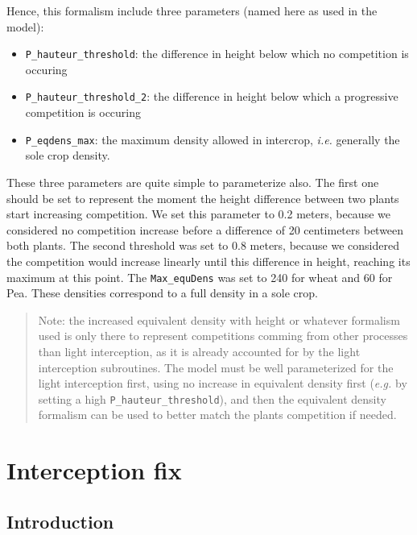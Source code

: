 \documentclass[]{book}
\providecommand{\tightlist}{%
  \setlength{\itemsep}{0pt}\setlength{\parskip}{0pt}}
\begin{document}
Hence, this formalism include three parameters (named here as used in the model):

\begin{itemize}
\tightlist
\item
  \texttt{P\_hauteur\_threshold}: the difference in height below which no competition is occuring
\item
  \texttt{P\_hauteur\_threshold\_2}: the difference in height below which a progressive competition is occuring
\item
  \texttt{P\_eqdens\_max}: the maximum density allowed in intercrop, \emph{i.e.} generally the sole crop density.
\end{itemize}

These three parameters are quite simple to parameterize also. The first one should be set to represent the moment the height difference between two plants start increasing competition. We set this parameter to 0.2 meters, because we considered no competition increase before a difference of 20 centimeters between both plants. The second threshold was set to 0.8 meters, because we considered the competition would increase linearly until this difference in height, reaching its maximum at this point. The \texttt{Max\_equDens} was set to 240 for wheat and 60 for Pea. These densities correspond to a full density in a sole crop.

\begin{quote}
Note: the increased equivalent density with height or whatever formalism used is only there to represent competitions comming from other processes than light interception, as it is already accounted for by the light interception subroutines. The model must be well parameterized for the light interception first, using no increase in equivalent density first (\emph{e.g.} by setting a high \texttt{P\_hauteur\_threshold}), and then the equivalent density formalism can be used to better match the plants competition if needed.
\end{quote}

\hypertarget{intercfix}{%
\chapter{Interception fix}\label{intercfix}}

\hypertarget{introduction-12}{%
\section{Introduction}\label{introduction-12}}
\end{document}
